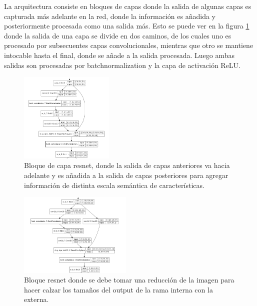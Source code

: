        La arquitectura consiste en bloques de capas donde la salida de algunas capas es capturada más adelante en la red, donde la información es añadida y posteriormente procesada como una salida más. Esto se puede ver en la figura \ref{fig:resnet_block} donde la salida de una capa se divide en dos caminos, de los cuales uno es procesado por subsecuentes capas convolucionales, mientras que otro se mantiene intocable hasta el final, donde se añade a la salida procesada. Luego ambas salidas son procesadas por batchnormalization y la capa de activación ReLU.
        
        \begin{figure}[t]
            \centering
            \includegraphics[width=0.4\textwidth]{img/resnet_layer.png}
            \caption{Bloque de capa resnet, donde la salida de capas anteriores va hacia adelante y es añadida a la salida de capas posteriores para agregar información de distinta escala semántica de características.}
            \label{fig:resnet_block}
        \end{figure}
        
        \begin{figure}[t]
            \centering
            \includegraphics[width=0.48\textwidth]{img/resnet_layer2.png}
            \caption{Bloque resnet donde se debe tomar una reducción de la imagen para hacer calzar los tamaños del output de la rama interna con la externa.}
            \label{fig:resnet_block2}
        \end{figure}
        
